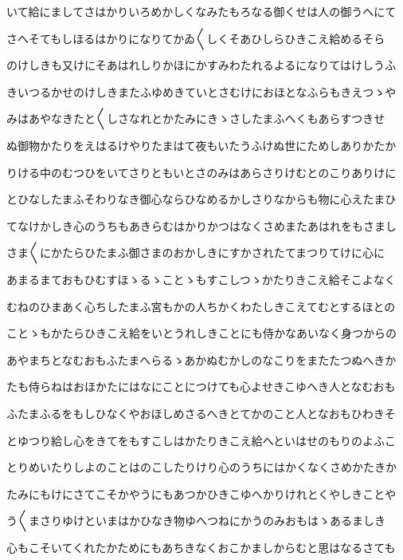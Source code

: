\documentclass[a4paper,11pt,landscape]{ltjtarticle}
\begin{document}
\par\medskip
いて給にましてさはかりいろめかしくなみたもろなる御くせは人の御うへにて
\par\medskip
さへそてもしほるはかりになりてかゐ〱しくそあひしらひきこえ給めるそら
\par\medskip
のけしきも又けにそあはれしりかほにかすみわたれるよるになりてはけしうふ
\par\medskip
きいつるかせのけしきまたふゆめきていとさむけにおほとなふらもきえつゝや
\par\medskip
みはあやなきたと〱しさなれとかたみにきゝさしたまふへくもあらすつきせ
\par\medskip
ぬ御物かたりをえはるけやりたまはて夜もいたうふけぬ世にためしありかたか
\par\medskip
りける中のむつひをいてさりともいとさのみはあらさりけむとのこりありけに
\par\medskip
とひなしたまふそわりなき御心ならひなめるかしさりなからも物に心えたまひ
\par\medskip
てなけかしき心のうちもあきらむはかりかつはなくさめまたあはれをもさまし
\par\medskip
さま〱にかたらひたまふ御さまのおかしきにすかされたてまつりてけに心に
\par\medskip
あまるまておもひむすほゝるゝことゝもすこしつゝかたりきこえ給そこよなく
\par\medskip
むねのひまあく心ちしたまふ宮もかの人ちかくわたしきこえてむとするほとの
\par\medskip
ことゝもかたらひきこえ給をいとうれしきことにも侍かなあいなく身つからの
\par\medskip
あやまちとなむおもふたまへらるゝあかぬむかしのなこりをまたたつぬへきか
\par\medskip
たも侍らねはおほかたにはなにことにつけても心よせきこゆへき人となむおも
\par\medskip
ふたまふるをもしひなくやおほしめさるへきとてかのこと人となおもひわきそ
\par\medskip
とゆつり給し心をきてをもすこしはかたりきこえ給へといはせのもりのよふこ
\par\medskip
とりめいたりしよのことはのこしたりけり心のうちにはかくなくさめかたきか
\par\medskip
たみにもけにさてこそかやうにもあつかひきこゆへかりけれとくやしきことや
\par\medskip
う〱まさりゆけといまはかひなき物ゆへつねにかうのみおもはゝあるましき
\par\medskip
心もこそいてくれたかためにもあちきなくおこかましからむと思はなるさても
\par\medskip
\end{document}
